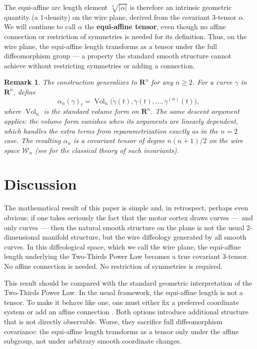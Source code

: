 \documentclass[10pt,letterpaper,reqno]{amsart}
\newcommand{\RR}{\mathbf{R}}
\newcommand{\cW}{\mathcal{W}}
\DeclareMathOperator{\vol}{Vol}
\newtheorem*{remark}{Remark}
\begin{document}
  The equi-affine arc length element $\sqrt[3]{|\alpha|}$ is therefore an intrinsic geometric quantity (a $1$-density) on the wire plane,
  derived from the covariant 3-tensor $\alpha$.
  We will continue to call $\alpha$ the \textbf{equi-affine tensor}, even though no affine connection or restriction of symmetries is needed for its definition.
  Thus,
  on the wire plane,
  the equi-affine length transforms as a tensor under the full diffeomorphism group
  --- a property the standard smooth structure cannot achieve without restricting symmetries or adding a connection.
  
  \begin{remark}
    The construction generalizes to $\RR^n$ for any $n \ge 2$.
    For a curve $\gamma$ in $\RR^n$,
    define
    \[
      \alpha_n(\gamma)_t = \vol_n\!\big(\dot\gamma(t), \ddot\gamma(t), \dots, \gamma^{(n)}(t)\big),
      \]
    where $\vol_n$ is the standard volume form on $\RR^n$.
    The same descent argument applies: the volume form vanishes when its arguments are linearly dependent,
    which handles the extra terms from reparametrization exactly as in the $n=2$ case.
    The resulting $\alpha_n$ is a covariant tensor of degree $n(n+1)/2$ on the wire space $\cW_n$
    (see \cite{Bla23} for the classical theory of such invariants).
  \end{remark}
  
  \section{Discussion}
  
  The mathematical result of this paper is simple and,
  in retrospect,
  perhaps even obvious:
  if one takes seriously the fact that the motor cortex draws curves
  ---~and only curves~---
  then the natural smooth structure on the plane is not the usual 2-dimensional manifold structure,
  but the wire diffeology generated by all smooth curves.
  In this diffeological space,
  which we call the wire plane,
  the equi-affine length underlying the Two-Thirds Power Law becomes a true covariant 3-tensor.
  No affine connection is needed.
  No restriction of symmetries is required.
  
  This result should be compared with the standard geometric interpretation of the Two-Thirds Power Law.
  In the usual framework,
  the equi-affine length is not a tensor.
  To make it behave like one,
  one must either fix a preferred coordinate system or add an affine connection \cite{PS97,FH07}.
  Both options introduce additional structure that is not directly observable.
  Worse,
  they sacrifice full diffeomorphism covariance:
  the equi-affine length transforms as a tensor only under the affine subgroup,
  not under arbitrary smooth coordinate changes.
  
\end{document}
